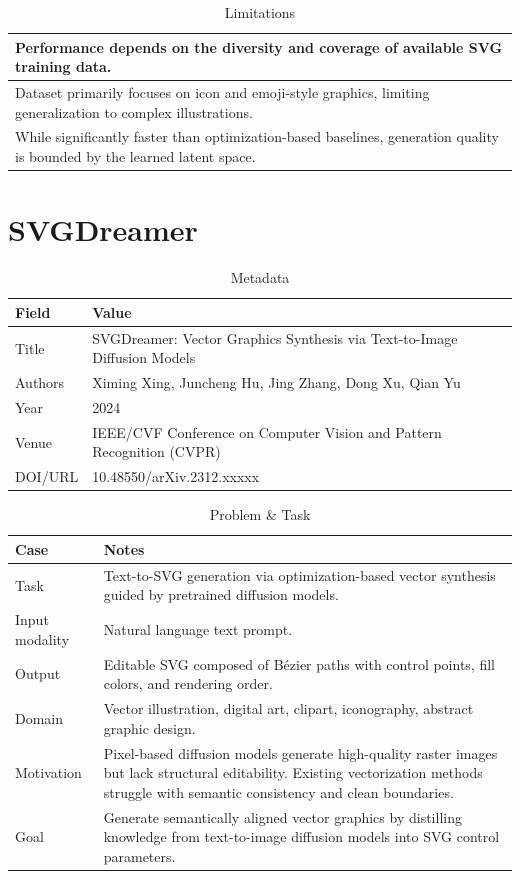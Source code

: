 \begin{table}[h!]
\centering
\caption{Limitations}
\begin{tabular}{|p{14cm}|}
\hline
Performance depends on the diversity and coverage of available SVG training data. \\ \hline
Dataset primarily focuses on icon and emoji-style graphics, limiting generalization to complex illustrations. \\ \hline
While significantly faster than optimization-based baselines, generation quality is bounded by the learned latent space. \\ \hline
\end{tabular}
\end{table}



\newpage
\chapter{SVGDreamer}

\begin{table}[h!]
\centering
\caption{Metadata}
\begin{tabular}{|l|l|}
\hline
\textbf{Field} & \textbf{Value} \\ \hline
Title & SVGDreamer: Vector Graphics Synthesis via Text-to-Image Diffusion Models \\ \hline
Authors & Ximing Xing, Juncheng Hu, Jing Zhang, Dong Xu, Qian Yu \\ \hline
Year & 2024 \\ \hline
Venue & IEEE/CVF Conference on Computer Vision and Pattern Recognition (CVPR) \\ \hline
DOI/URL & 10.48550/arXiv.2312.xxxxx \\ \hline
\end{tabular}
\end{table}


\begin{table}[h!]
\centering
\caption{Problem \& Task}
\begin{tabular}{|l|p{10cm}|}
\hline
\textbf{Case} & \textbf{Notes} \\ \hline
Task & Text-to-SVG generation via optimization-based vector synthesis guided by pretrained diffusion models. \\ \hline
Input modality & Natural language text prompt. \\ \hline
Output & Editable SVG composed of Bézier paths with control points, fill colors, and rendering order. \\ \hline
Domain & Vector illustration, digital art, clipart, iconography, abstract graphic design. \\ \hline
Motivation & Pixel-based diffusion models generate high-quality raster images but lack structural editability. Existing vectorization methods struggle with semantic consistency and clean boundaries. \\ \hline
Goal & Generate semantically aligned vector graphics by distilling knowledge from text-to-image diffusion models into SVG control parameters. \\ \hline
\end{tabular}
\end{table}


